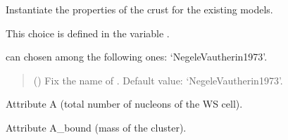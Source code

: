 \documentclass[letterpaper,10pt,english]{sphinxmanual}
\begin{document}
\begin{fulllineitems}
\label{\detokenize{source/api/setup_crust:nucleardatapy.setup_crust.SetupCrust}}
\pysigstartsignatures
\pysiglinewithargsret
{}
{}
{}
\pysigstopsignatures
\sphinxAtStartPar
Instantiate the properties of the crust for the existing models.

\sphinxAtStartPar
This choice is defined in the variable .

\sphinxAtStartPar
{} can chosen among the following ones: ‘Negele\sphinxhyphen{}Vautherin\sphinxhyphen{}1973’.
\begin{quote}\begin{description}
\sphinxAtStartPar
{} (\sphinxstyleliteralemphasis{\sphinxupquote{, }}) \textendash{} Fix the name of . Default value: ‘Negele\sphinxhyphen{}Vautherin\sphinxhyphen{}1973’.

\end{description}\end{quote}

\sphinxAtStartPar
{}

\begin{fulllineitems}
\label{\detokenize{source/api/setup_crust:nucleardatapy.setup_crust.SetupCrust.A}}
\pysigstartsignatures
\pysigline
{}
\pysigstopsignatures
\sphinxAtStartPar
Attribute A (total number of nucleons of the WS cell).

\end{fulllineitems}


\begin{fulllineitems}
\label{\detokenize{source/api/setup_crust:nucleardatapy.setup_crust.SetupCrust.A_bound}}
\pysigstartsignatures
\pysigline
{}
\pysigstopsignatures
\sphinxAtStartPar
Attribute A\_bound (mass of the cluster).


\end{fulllineitems}
\end{fulllineitems}
\end{document}

